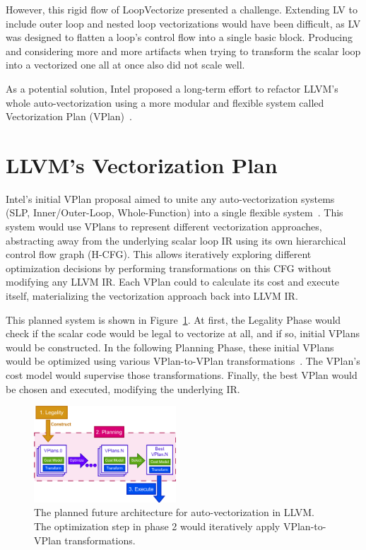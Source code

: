 \documentclass[sigplan,11pt,nonacm]{acmart}
\begin{document}
However, this rigid flow of LoopVectorize presented a challenge. Extending LV to include outer loop 
and nested loop vectorizations would have been difficult, as LV was designed to flatten a
loop's control flow into a single basic block. Producing and considering more and 
more artifacts when trying to transform the scalar loop into a vectorized one all at once also did 
not scale well.

As a potential solution, Intel proposed a long-term effort to refactor LLVM's whole auto-vectorization
using a more modular and flexible system called Vectorization Plan (VPlan)~\cite{llvmextloopvec}.




\section{LLVM's Vectorization Plan}
\label{sec:vplan}

Intel's initial VPlan proposal aimed to unite any 
auto-vectorization systems (SLP, Inner/Outer-Loop, Whole-Function) into a 
single flexible system~\cite{llvmextloopvec,llvmintrvplan,llvmvplanstate}. 
This system would use VPlans to represent different 
vectorization approaches, abstracting away from the underlying scalar loop IR using its own 
hierarchical control flow graph (H-CFG). This allows iteratively exploring different 
optimization decisions by performing transformations on this CFG without modifying any LLVM IR.
Each VPlan could to calculate its cost and execute itself, materializing the vectorization 
approach back into LLVM IR.

This planned system is shown in Figure~\ref{fig:vplan-future}. At first, the Legality 
Phase would check if the scalar code would be legal to vectorize at all, and if so, 
initial VPlans would be constructed. In the following Planning Phase, these initial 
VPlans would be optimized using various VPlan-to-VPlan transformations~\cite{llvmouterloopstatus}. 
The VPlan's cost model would supervise those transformations. Finally, the best VPlan 
would be chosen and executed, modifying the underlying IR.

\begin{figure}
  \centering
  \includegraphics[width=0.475\textwidth]{images/vplan-future.png}
  \caption{The planned future architecture for auto-vectorization in LLVM. The 
  optimization step in phase 2 would iteratively apply VPlan-to-VPlan transformations.}
  \label{fig:vplan-future}
\end{figure}
\end{document}
